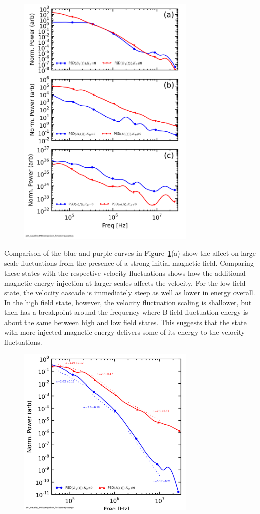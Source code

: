 \documentclass[aip,prl,amsmath,amssymb,reprint,superscriptaddress]{revtex4-1} %
\begin{document}
\begin{figure}[!htbp]
\centerline{
\includegraphics[width=8.5cm]{BvsFlowvsDensspec_2fluxes_separateplots_40t60us}}
\caption{\label{fig:BvsFlow}}
\end{figure}

Comparison of the blue and purple curves in Figure~\ref{fig:BvsFlow}(a) show the affect on large scale fluctuations from the presence of a strong initial magnetic field. Comparing these states with the respective velocity fluctuations shows how the additional magnetic energy injection at larger scales affects the velocity. For the low field state, the velocity cascade is immediately steep as well as lower in energy overall. In the high field state, however, the velocity fluctuation scaling is shallower, but then has a breakpoint around the frequency where B-field fluctuation energy is about the same between high and low field states. This suggests that the state with more injected magnetic energy delivers some of its energy to the velocity fluctuations.

\begin{figure}[!htbp]
\centerline{
\includegraphics[width=8.5cm]{BvsFlowspec_wFits_40t60us}}
\caption{\label{fig:BvsFlow_wFits}}
\end{figure}
\end{document}
